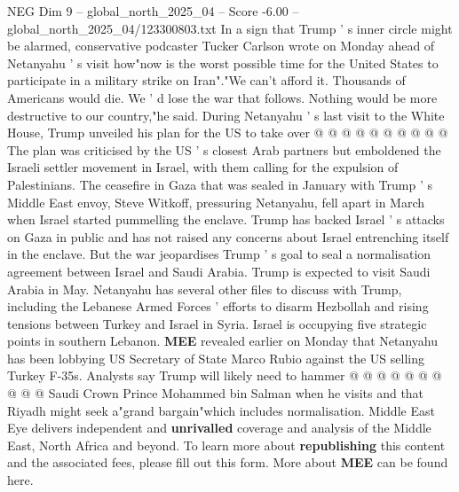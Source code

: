 \begin{textsample}{NEG Dim 9 – global\_north\_2025\_04 – Score -6.00 – global\_north\_2025\_04/123300803.txt}
In a sign that Trump ' s inner circle might be alarmed, conservative podcaster Tucker Carlson wrote on Monday ahead of Netanyahu ' s visit how"now is the worst possible time for the United States to participate in a military strike on Iran"."We can't afford it.
Thousands of Americans would die.
We ' d lose the war that follows.
Nothing would be more destructive to our country,"he said.
During Netanyahu ' s last visit to the White House, Trump unveiled his plan for the US to take over @ @ @ @ @ @ @ @ @ @ The plan was criticised by the US ' s closest Arab partners but emboldened the Israeli settler movement in Israel, with them calling for the expulsion of Palestinians.
The ceasefire in Gaza that was sealed in January with Trump ' s Middle East envoy, Steve Witkoff, pressuring Netanyahu, fell apart in March when Israel started pummelling the enclave.
Trump has backed Israel ' s attacks on Gaza in public and has not raised any concerns about Israel entrenching itself in the enclave.
But the war jeopardises Trump ' s goal to seal a normalisation agreement between Israel and Saudi Arabia.
Trump is expected to visit Saudi Arabia in May.
Netanyahu has several other files to discuss with Trump, including the Lebanese Armed Forces ' efforts to disarm Hezbollah and rising tensions between Turkey and Israel in Syria.
Israel is occupying five strategic points in southern Lebanon. \textbf{MEE} revealed earlier on Monday that Netanyahu has been lobbying US Secretary of State Marco Rubio against the US selling Turkey F-35s.
Analysts say Trump will likely need to hammer @ @ @ @ @ @ @ @ @ @ Saudi Crown Prince Mohammed bin Salman when he visits and that Riyadh might seek a"grand bargain"which includes normalisation.
Middle East Eye delivers independent and \textbf{unrivalled} coverage and analysis of the Middle East, North Africa and beyond.
To learn more about \textbf{republishing} this content and the associated fees, please fill out this form.
More about \textbf{MEE} can be found here.

\end{textsample}
